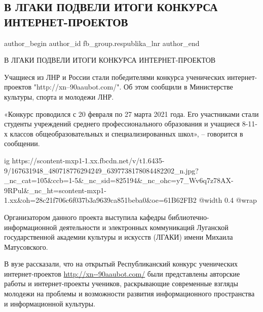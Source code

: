  
 
 
 
 
 
\subsection{В ЛГАКИ ПОДВЕЛИ ИТОГИ КОНКУРСА ИНТЕРНЕТ-ПРОЕКТОВ}
\label{sec:02_04_2021.fb.fb_group.respublika_lnr.2.lgaki_konkurs_internet}
 
\ifcmt
 author_begin
   author_id fb_group.respublika_lnr
 author_end
\fi

В ЛГАКИ ПОДВЕЛИ ИТОГИ КОНКУРСА ИНТЕРНЕТ-ПРОЕКТОВ

Учащиеся из ЛНР и России стали победителями конкурса ученических
интернет-проектов "http://xn--90aaubot.com/". Об этом сообщили в Министерстве
культуры, спорта и молодежи ЛНР.

«Конкурс проводился с 20 февраля по 27 марта 2021 года. Его участниками стали
студенты учреждений среднего профессионального образования и учащиеся 8-11-х
классов общеобразовательных и специализированных школ», – говорится в
сообщении.

\ifcmt
  ig https://scontent-mxp1-1.xx.fbcdn.net/v/t1.6435-9/167631948_480718776294249_6397738178084482202_n.jpg?_nc_cat=105&ccb=1-5&_nc_sid=825194&_nc_ohc=y7_Wv6q7z78AX-9RPul&_nc_ht=scontent-mxp1-1.xx&oh=28c21f706c6f037b3a9639ca851beba0&oe=61B62FB2
  @width 0.4
  @wrap 
\fi

Организатором данного проекта выступила кафедры библиотечно-информационной
деятельности и электронных коммуникаций Луганской государственной академии
культуры и искусств (ЛГАКИ) имени Михаила Матусовского.

В вузе рассказали, что на открытый Республиканский конкурс ученических
интернет-проектов \url{http://xn--90aaubot.com/} были представлены авторские работы
и интернет-проекты учеников, раскрывающие современные взгляды молодежи на
проблемы и возможности развития информационного пространства и информационной
культуры.

